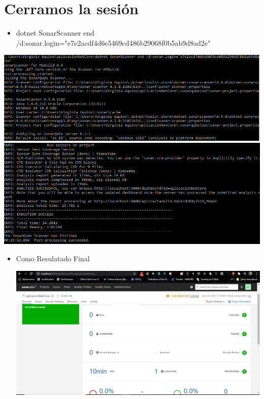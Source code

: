 \section{ Cerramos la sesión } 
\begin{itemize}
    \item dotnet SonarScanner end /d:sonar.login="e7e2acdf4d6e5469cd486b29068f0b5ab9d8ad2e"
\end{itemize}
\begin{center}
\includegraphics[width=\columnwidth]{images/15}\newline
\includegraphics[width=\columnwidth]{images/16}\newline

\end{center}
\begin{itemize}
    \item Como Resulatado Final
    \begin{center}

\includegraphics[width=\columnwidth]{images/17}\newline
\end{center}
\end{itemize}